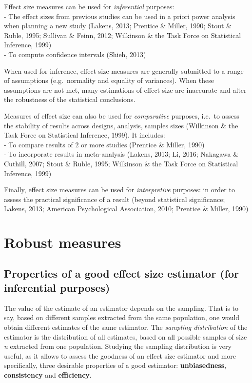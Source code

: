 \documentclass[man]{apa6}
\begin{document}
Effect size measures can be used for \emph{inferential} purposes:\\
- The effect sizes from previous studies can be used in a priori power analysis when planning a new study (Lakens, 2013; Prentice \& Miller, 1990; Stout \& Ruble, 1995; Sullivan \& Feinn, 2012; Wilkinson \& the Task Force on Statistical Inference, 1999)\\
- To compute confidence intervals (Shieh, 2013)

When used for inference, effect size measures are generally submitted to a range of assumptions (e.g.~normality and equality of variances). When these assumptions are not met, many estimations of effect size are inaccurate and alter the robustness of the statistical conclusions.

Measures of effect size can also be used for \emph{comparative} purposes, i.e.~to assess the stability of results across designs, analysis, samples sizes (Wilkinson \& the Task Force on Statistical Inference, 1999). It includes:\\
- To compare results of 2 or more studies (Prentice \& Miller, 1990)\\
- To incorporate results in meta-analysis (Lakens, 2013; Li, 2016; Nakagawa \& Cuthill, 2007; Stout \& Ruble, 1995; Wilkinson \& the Task Force on Statistical Inference, 1999)

Finally, effect size measures can be used for \emph{interpretive} purposes: in order to assess the practical significance of a result (beyond statistical significance; Lakens, 2013; American Psychological Association, 2010; Prentice \& Miller, 1990)

\hypertarget{robust-measures}{%
\section{Robust measures}\label{robust-measures}}

\hypertarget{properties-of-a-good-effect-size-estimator-for-inferential-purposes}{%
\subsection{Properties of a good effect size estimator (for inferential purposes)}\label{properties-of-a-good-effect-size-estimator-for-inferential-purposes}}

The value of the estimate of an estimator depends on the sampling. That is to say, based on different samples extracted from the same population, one would obtain different estimates of the same estimator. The \emph{sampling distribution} of the estimator is the distribution of all estimates, based on all possible samples of size \emph{n} extracted from one population. Studying the sampling distribution is very useful, as it allows to assess the goodness of an effect size estimator and more specifically, three desirable properties of a good estimator: \textbf{unbiasedness}, \textbf{consistency} and \textbf{efficiency}.
\end{document}
